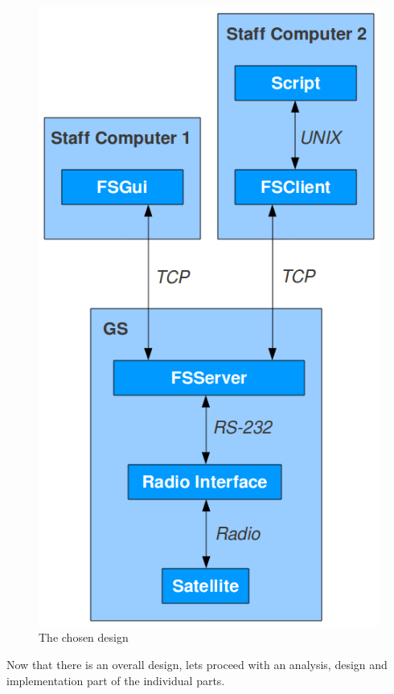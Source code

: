 \begin{figure}[h!] \centering
	\includegraphics[scale=0.5]{img/chosen_design}
  \caption{The chosen design}
\end{figure}

Now that there is an overall design, lets proceed with an analysis, design and implementation part of the individual parts.
